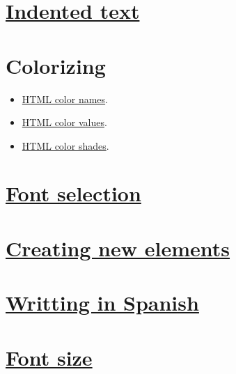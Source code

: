 
\chapter{\href{http://www.w3schools.com/tags/tag_pre.asp}{Indented text}}



\chapter{Colorizing}

\begin{itemize}
\item \href{http://www.w3schools.com/html/html_colornames.asp}{HTML
    color names}.
\item \href{http://www.w3schools.com/html/html_colorvalues.asp}{HTML
    color values}.
\item \href{http://www.w3schools.com/html/html_colors.asp}{HTML
    color shades}.
\end{itemize}



\chapter{\href{http://www.w3schools.com/cssref/css_websafe_fonts.asp}{Font selection}}



\chapter{\href{http://www.w3schools.com/html/html5_browsers.asp}{Creating new elements}}



\chapter{\href{http://www.w3schools.com/charsets/ref_html_8859.aspl}{Writting in Spanish}}



\chapter{\href{http://www.w3schools.com/tags/att_font_size.asp}{Font size}}

